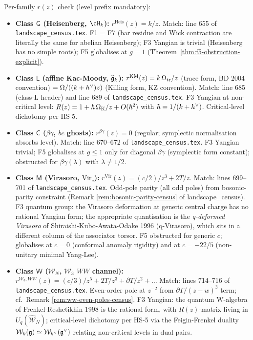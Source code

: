 Per-family $r(z)$ check (level prefix mandatory):

\begin{itemize}
\item \textbf{Class $\mathsf{G}$ (Heisenberg, $\cH_k$):}
   $r^{\mathrm{Heis}}(z) = k/z$. Match: line 655 of
   \texttt{landscape\_census.tex}. F1 = F7 (bar residue and Wick
   contraction are literally the same for abelian Heisenberg); F3
   Yangian is trivial (Heisenberg has no simple roots); F5 globalises
   at $g = 1$ (Theorem~\ref{thm:f5-obstruction-explicit}).

\item \textbf{Class $\mathsf{L}$ (affine Kac-Moody,
   $\widehat{\mathfrak{g}}_k$):}
   $r^{\mathrm{KM}}(z) = k\,\Omega_{\mathrm{tr}}/z$ (trace form, BD 2004 convention)
   $= \Omega/((k+h^{\vee})z)$ (Killing form, KZ convention). Match:
   line 685 (class-L header) and line 689 of
   \texttt{landscape\_census.tex}. F3 Yangian at
   non-critical level: $R(z) = 1 + \hbar\,\Omega_{\mathrm{K}}/z + O(\hbar^2)$
   with $\hbar = 1/(k+h^{\vee})$. Critical-level dichotomy per HS-5.

\item \textbf{Class $\mathsf{C}$ ($\beta\gamma$, $bc$ ghosts):}
   $r^{\beta\gamma}(z) = 0$ (regular; symplectic normalisation absorbs
   level). Match: line 670--672 of \texttt{landscape\_census.tex}. F3
   Yangian trivial; F5 globalises at $g \le 1$ only for diagonal
   $\beta\gamma$ (symplectic form constant); obstructed for
   $\beta\gamma(\lambda)$ with $\lambda \ne 1/2$.

\item \textbf{Class $\mathsf{M}$ (Virasoro, $\mathrm{Vir}_c$):}
   $r^{\mathrm{Vir}}(z) = (c/2)/z^3 + 2T/z$. Match: lines 699--701 of
   \texttt{landscape\_census.tex}. Odd-pole parity (all odd poles)
   from bosonic-parity constraint (Remark
   \ref{rem:bosonic-parity-census} of landscape\_census). F3 quantum
   group: the Virasoro deformation at generic central charge has no
   rational Yangian form; the appropriate quantisation is the
   \emph{q-deformed Virasoro} of Shiraishi-Kubo-Awata-Odake 1996
   (q-Virasoro), which sits in a different column of the associator
   torsor. F5 obstructed for generic $c$; globalises at $c = 0$
   (conformal anomaly rigidity) and at $c = -22/5$ (non-unitary
   minimal Yang-Lee).

\item \textbf{Class $\mathsf{W}$ ($\mathcal{W}_N$, $\mathcal{W}_3$
   $WW$ channel):}
   $r^{\mathcal{W}_3, WW}(z) = (c/3)/z^5 + 2T/z^3 + \partial T/z^2 + \ldots$
   Match: lines 714--716 of \texttt{landscape\_census.tex}. Even-order
   pole at $z^{-2}$ from $\partial T/(z-w)^3$ term; cf.\ Remark
   \ref{rem:ww-even-poles-census}. F3 Yangian: the quantum W-algebra of
   Frenkel-Reshetikhin 1998 is the rational form, with $R(z)$-matrix
   living in $U_q(\widehat{\mathcal{W}}_N)$; critical-level dichotomy
   per HS-5 via the Feigin-Frenkel duality
   $\mathcal{W}_k(\mathfrak{g}) \simeq \mathcal{W}_{k^\vee}(\mathfrak{g}^\vee)$
   relating non-critical levels in dual pairs.


\end{itemize}
